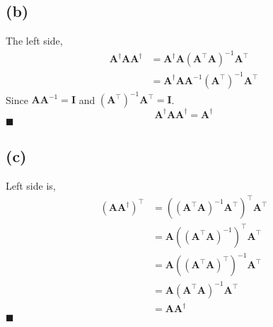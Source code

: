\documentclass{article}
\newcommand{\mat}[1]{\mathbf{#1}}
\begin{document}
\subsection*{(b)}
The left side, 
\begin{align}
    \mat{A}^\dagger \mat{A}\mat{A}^\dagger &= \mat{A}^\dagger \mat{A} (\mat{A}^\top \mat{A})^{-1}\mat{A}^\top \nonumber \\
    &= \mat{A}^\dagger \mat{A}\mat{A}^{-1} (\mat{A}^\top)^{-1}\mat{A}^\top \nonumber 
\end{align}
Since $\mat{A}\mat{A}^{-1} = \mat{I}$ and $(\mat{A}^\top)^{-1}\mat{A}^\top = \mat{I}$.
$$\mat{A}^\dagger \mat{A}\mat{A}^\dagger = \mat{A}^\dagger$$
$\blacksquare$

\subsection*{(c)}
Left side is,
\begin{align}
    (\mat{A}\mat{A}^\dagger)^\top &= ((\mat{A}^\top \mat{A})^{-1}\mat{A}^\top)^\top \mat{A}^\top \nonumber \\
    &= \mat{A} ((\mat{A}^\top \mat{A})^{-1})^\top \mat{A}^\top \nonumber \\
    &= \mat{A} ((\mat{A}^\top \mat{A})^\top)^{-1} \mat{A}^\top \nonumber \\
    &= \mat{A} (\mat{A}^\top \mat{A})^{-1}\mat{A}^\top \nonumber \\
    &= \mat{A}\mat{A}^\dagger \nonumber
\end{align}
$\blacksquare$
\end{document}
